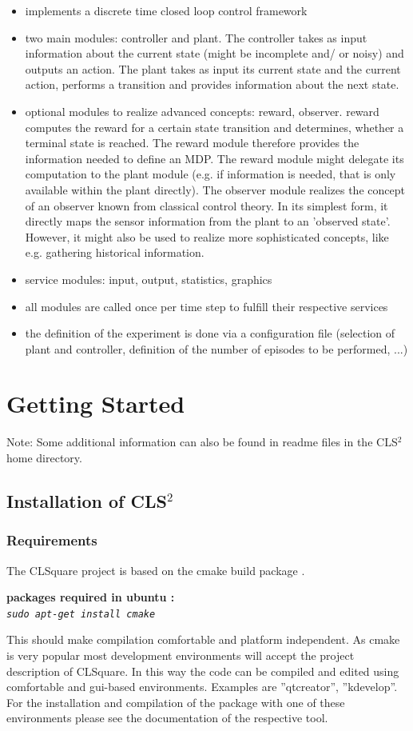 \documentclass[a4paper,12pt,german]{article}
\newcommand{\cls}{{CLS$^2$ }}
\newcommand{\ite}{\begin{itemize}}
\newcommand{\eti}{\end{itemize}}
\newcommand{\anmerkung}[2]{\vspace*{0.01cm}\begin{center}\begin{graybox}{\bf #1 :\\}{\em #2}\end{graybox}\end{center}\vspace*{0.1cm}}
\begin{document}
\ite
\item implements a discrete time closed loop control framework
\item two main modules: controller and plant. The controller takes as
  input information about the current state (might be incomplete and/
  or noisy) and outputs an action. The plant takes as input its
  current state and the current action, performs a transition and
  provides information about the next state.
\item optional modules to realize advanced concepts: reward, observer.
reward computes the reward for a certain state transition and determines, whether
a terminal state is reached. The reward module therefore provides the information
needed to define an MDP. The reward module might delegate its computation to the
plant module (e.g. if information is needed, that is only available within the
plant directly). The observer module realizes the concept of an observer known
from classical control theory. In its simplest form, it directly maps the sensor
information from the plant to an 'observed state'. However, it might also be used
to realize more sophisticated concepts, like e.g. gathering historical information.
\item service modules: input, output, statistics, graphics
\item all modules are called once per time step to fulfill their respective services
\item the definition of the experiment is done via a configuration file (selection
of plant and controller, definition of the number of episodes to be performed, ...)
\eti


\section{Getting Started}

Note: Some additional information can also be found in readme files in the \cls home directory.

\subsection{Installation of \cls}

\subsubsection{Requirements}

The CLSquare project is based on the cmake build package \cite{cmake}.
\anmerkung{packages required in ubuntu}{\lstinline|sudo apt-get install cmake|}
This should make compilation comfortable and platform independent.
As cmake is very popular most development environments will accept the project description of CLSquare.
In this way the code can be compiled and edited using comfortable and gui-based environments. Examples are ''qtcreator'', ''kdevelop''.
For the installation and compilation of the package with one of these environments please see the documentation of the respective tool.
\end{document}
